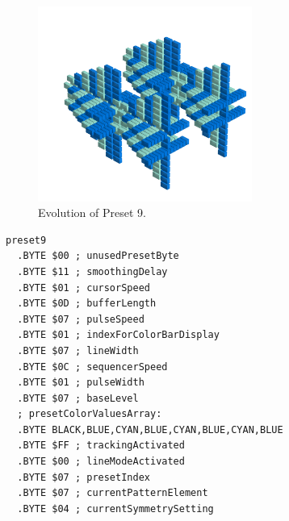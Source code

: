 \clearpage
\begin{minipage}[b]{0.48\linewidth}
\begin{figure}[H]                                                          
  \centering                                                             
  \begin{adjustbox}{width=7cm,center}                                   
  \includegraphics[width=7cm]{src/presets/pattern9-45.png}%
  \end{adjustbox}                                                        
\caption{Evolution of Preset 9.}                                           
\end{figure}                                                               
\end{minipage}
\hspace{0.1cm}
\begin{minipage}[b]{0.48\linewidth}                                       
\begin{lstlisting}[basicstyle=\ttfamily\scriptsize,caption=Data structure for Preset 9.]
preset9
  .BYTE $00 ; unusedPresetByte
  .BYTE $11 ; smoothingDelay
  .BYTE $01 ; cursorSpeed
  .BYTE $0D ; bufferLength
  .BYTE $07 ; pulseSpeed
  .BYTE $01 ; indexForColorBarDisplay
  .BYTE $07 ; lineWidth
  .BYTE $0C ; sequencerSpeed
  .BYTE $01 ; pulseWidth
  .BYTE $07 ; baseLevel
  ; presetColorValuesArray: 
  .BYTE BLACK,BLUE,CYAN,BLUE,CYAN,BLUE,CYAN,BLUE
  .BYTE $FF ; trackingActivated
  .BYTE $00 ; lineModeActivated
  .BYTE $07 ; presetIndex
  .BYTE $07 ; currentPatternElement
  .BYTE $04 ; currentSymmetrySetting
\end{lstlisting}
\end{minipage}

